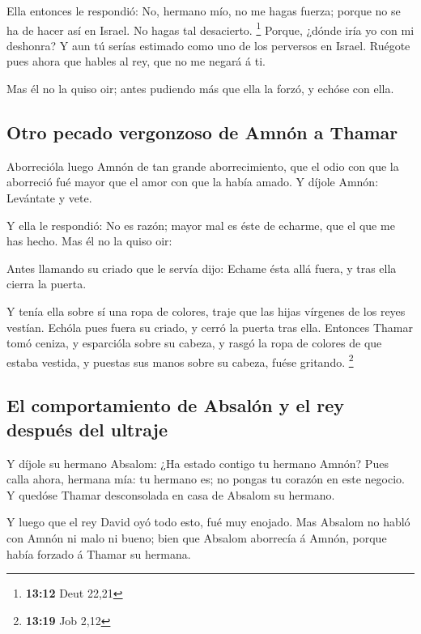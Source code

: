  Ella entonces le respondió: No, hermano mío, no me hagas
fuerza; porque no se ha de hacer así en Israel. No hagas tal desacierto.
\footnote{\textbf{13:12} Deut 22,21}  Porque, ¿dónde iría
yo con mi deshonra? Y aun tú serías estimado como uno de los perversos
en Israel. Ruégote pues ahora que hables al rey, que no me negará á ti.

 Mas él no la quiso oir; antes pudiendo más que ella la
forzó, y echóse con ella.

\hypertarget{otro-pecado-vergonzoso-de-amnuxf3n-a-thamar}{%
\subsection{Otro pecado vergonzoso de Amnón a
Thamar}\label{otro-pecado-vergonzoso-de-amnuxf3n-a-thamar}}

 Aborrecióla luego Amnón de tan grande aborrecimiento, que
el odio con que la aborreció fué mayor que el amor con que la había
amado. Y díjole Amnón: Levántate y vete.

 Y ella le respondió: No es razón; mayor mal es éste de
echarme, que el que me has hecho. Mas él no la quiso oir:

 Antes llamando su criado que le servía dijo: Echame ésta
allá fuera, y tras ella cierra la puerta.

 Y tenía ella sobre sí una ropa de colores, traje que las
hijas vírgenes de los reyes vestían. Echóla pues fuera su criado, y
cerró la puerta tras ella.  Entonces Thamar tomó ceniza, y
esparcióla sobre su cabeza, y rasgó la ropa de colores de que estaba
vestida, y puestas sus manos sobre su cabeza, fuése gritando.
\footnote{\textbf{13:19} Job 2,12}

\hypertarget{el-comportamiento-de-absaluxf3n-y-el-rey-despuuxe9s-del-ultraje}{%
\subsection{El comportamiento de Absalón y el rey después del
ultraje}\label{el-comportamiento-de-absaluxf3n-y-el-rey-despuuxe9s-del-ultraje}}

 Y díjole su hermano Absalom: ¿Ha estado contigo tu hermano
Amnón? Pues calla ahora, hermana mía: tu hermano es; no pongas tu
corazón en este negocio. Y quedóse Thamar desconsolada en casa de
Absalom su hermano.

 Y luego que el rey David oyó todo esto, fué muy enojado.
 Mas Absalom no habló con Amnón ni malo ni bueno; bien que
Absalom aborrecía á Amnón, porque había forzado á Thamar su hermana.

